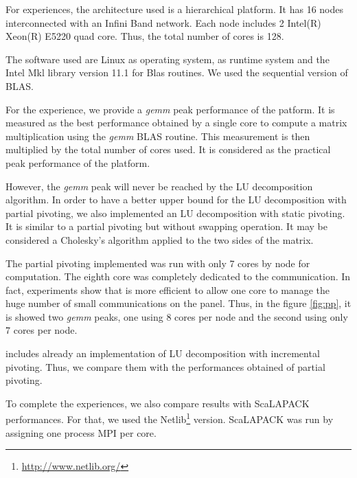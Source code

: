 For experiences, the architecture used is a hierarchical platform. It has 16 nodes interconnected with an Infini Band network. Each node includes  2 Intel(R) Xeon(R) E5220 quad core. Thus, the  total number of cores is 128.

The software used are Linux as operating system, \dague as runtime system and the Intel Mkl library version 11.1 for Blas routines. We used the sequential version of BLAS.

For the experience, we provide a \emph{gemm} peak performance of the patform. It is measured as the best performance obtained by a single core to compute a matrix multiplication using the \emph{gemm} BLAS routine. This measurement is then multiplied by the total number of cores used. It is considered as the practical peak performance of the platform. 

However, the \emph{gemm} peak will never be reached by the LU decomposition algorithm. In order to have a better upper bound for the LU decomposition with partial pivoting, we also implemented an LU decomposition with static pivoting. It is similar to a partial pivoting but without swapping operation. It may be considered a Cholesky's algorithm applied to the two sides of the matrix.


The partial pivoting implemented was run with only 7 cores by node for computation. The eighth core was completely dedicated to the communication. In fact, experiments show that is more efficient to allow one core to manage the huge number of small communications on the panel. Thus, in the figure \ref{fig:pp}, it is showed two \emph{gemm} peaks, one using 8 cores per node and the second using only 7 cores per node.

\dague includes already an implementation of LU decomposition with incremental pivoting. Thus, we compare them with the performances obtained of partial pivoting.

To complete the experiences, we also compare results with ScaLAPACK performances. For that, we used the Netlib\footnote{\url{http://www.netlib.org/}} version. ScaLAPACK was run by assigning one process MPI per core.




